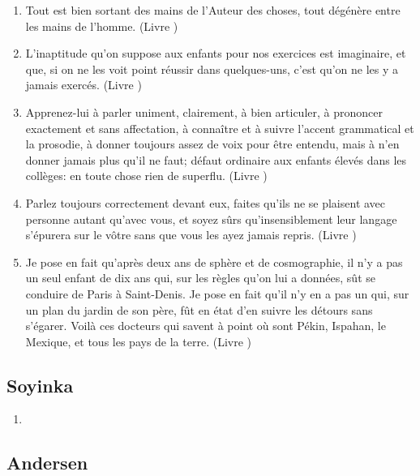 \documentclass[a4paper, 11pt, hidelinks]{article}
\newcommand{\rb}[1]{\Romanbar{#1}}
\begin{document}
\begin{enumerate}
    \item Tout est bien sortant des mains de l'Auteur des choses, tout dégénère entre les mains de l'homme. (Livre \rb{1})
    \item L'inaptitude qu'on suppose aux enfants pour nos exercices est imaginaire, et que, si on ne les voit point réussir dans quelques-uns, c'est qu'on ne les y a jamais exercés. (Livre \rb{2})
    \item Apprenez-lui à parler uniment, clairement, à bien articuler, à prononcer exactement et sans affectation, à connaître et à suivre l'accent grammatical et la prosodie, à donner toujours assez de voix pour être entendu, mais à n'en donner jamais plus qu'il ne faut; défaut ordinaire aux enfants élevés dans les collèges: en toute chose rien de superflu. (Livre \rb{2})
    \item Parlez toujours correctement devant eux, faites qu'ils ne se plaisent avec personne autant qu'avec vous, et soyez sûrs qu'insensiblement leur langage s'épurera sur le vôtre sans que vous les ayez jamais repris. (Livre \rb{1})
    \item Je pose en fait qu'après deux ans de sphère et de cosmographie, il n'y a pas un seul enfant de dix ans qui, sur les règles qu'on lui a données, sût se conduire de Paris à Saint-Denis. Je pose en fait qu'il n'y en a pas un qui, sur un plan du jardin de son père, fût en état d'en suivre les détours sans s'égarer. Voilà ces docteurs qui savent à point où sont Pékin, Ispahan, le Mexique, et tous les pays de la terre. (Livre \rb{2})
\end{enumerate}



\subsection{Soyinka}


\begin{enumerate}
    \item 
\end{enumerate}




\subsection{Andersen}
\end{document}

